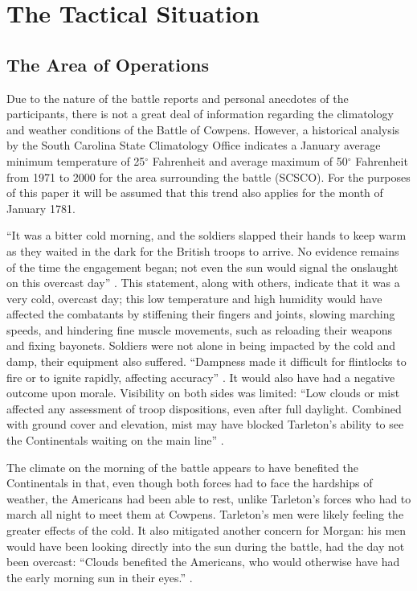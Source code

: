 \section{The Tactical Situation}


\subsection{The Area of Operations}


Due to the nature of the battle reports and personal anecdotes of the
participants, there is not a great deal of information regarding the climatology
and weather conditions of the Battle of Cowpens.  However, a historical analysis
by the South Carolina State Climatology Office indicates a January average
minimum temperature of 25$^\circ$ Fahrenheit and average maximum of 50$^\circ$ Fahrenheit from
1971 to 2000 for the area surrounding the battle (SCSCO).  For the purposes of
this paper it will be assumed that this trend also applies for the month of
January 1781.

``It was a bitter cold morning, and the soldiers slapped their hands to keep warm
as they waited in the dark for the British troops to arrive.  No evidence
remains of the time the engagement began; not even the sun would signal the
onslaught on this overcast day'' \cite[51]{moncure_cowpens_1996}.  This statement, along with
others, indicate that it was a very cold, overcast day; this low  temperature
and high humidity would have affected the combatants by stiffening their fingers
and joints, slowing marching speeds, and hindering fine muscle movements, such
as reloading their weapons and fixing bayonets. Soldiers were not alone in being
impacted by the cold and damp, their equipment also suffered.  ``Dampness made it
difficult for flintlocks to fire or to ignite rapidly, affecting accuracy'' \cite[79]{babits_devil_2001}.
It would also have had a negative outcome upon morale. 
Visibility on both sides was limited: ``Low clouds or mist affected any
assessment of troop dispositions, even after full daylight.  Combined with
ground cover and elevation, mist may have blocked Tarleton's ability to see the
Continentals waiting on the main line'' \cite[80]{babits_devil_2001}.

The climate on the morning of the battle appears to have benefited the
Continentals in that, even though both forces had to face the hardships of
weather, the Americans had been able to rest, unlike Tarleton's forces who had
to march all night to meet them at Cowpens.  Tarleton’s men were likely feeling
the greater effects of the cold.  It also mitigated another concern for Morgan:
his men would have been looking directly into the sun during the battle, had the
day not been overcast: “Clouds benefited the Americans, who would otherwise have
had the early morning sun in their eyes.” \cite[67]{moncure_cowpens_1996}.  


